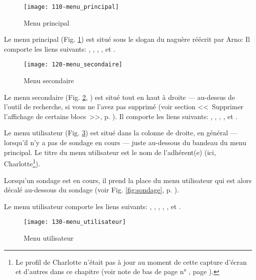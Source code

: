 
\begin{figure}
    \texttt{[image: 110-menu\_principal]}
    \caption{Menu principal}
    \label{fig:menuPrincipal}
\end{figure}
Le menu principal (Fig. \ref{fig:menuPrincipal}) est situé sous le slogan du \sel{} naguère réécrit par Arno:  Il comporte les liens suivants: , , , , et .
\begin{figure}
    \texttt{[image: 120-menu\_secondaire]}
    \caption{Menu secondaire}
    \label{fig:menuSecondaire}
\end{figure}


Le menu secondaire (Fig. \ref{fig:menuSecondaire}, ) est situé tout en haut à droite --- au-dessus de l’outil de recherche, si vous ne l’avez pas supprimé (voir section <<~Supprimer l’affichage de certains blocs~>>, p. \pageref{sec:supprimerBlocs}). Il comporte les liens suivants: , , , , et .

\label{sec:menuUtilisateur}

Le menu utilisateur (Fig. \ref{fig:menuUtilisateur}) 
est situé dans la colonne de droite, en général --- \cad{} lorsqu'il n'y a pas de sondage en cours --- juste au-dessous du bandeau du menu principal. Le titre du menu utilisateur est le nom de l’adhérent(e) (ici, Charlotte\footnote{Le profil de Charlotte n'était pas à jour au moment de cette capture d'écran et d'autres dans ce chapitre (voir note de bas de page n° \thenoteProfilPasAJour, page \pageref{page:profilPasAJour}).}).

Lorsqu'un sondage est en cours, il prend la place du menu utilisateur qui est alors décalé au-dessous du sondage (voir Fig. \ref{fig:sondage}, p. \pageref{fig:sondage}).

Le menu utilisateur comporte les liens suivants: ,
, , , ,  et .
\begin{figure}
    \centering
    \texttt{[image: 130-menu\_utilisateur]}
    \caption{Menu utilisateur}
    \label{fig:menuUtilisateur}
\end{figure}

